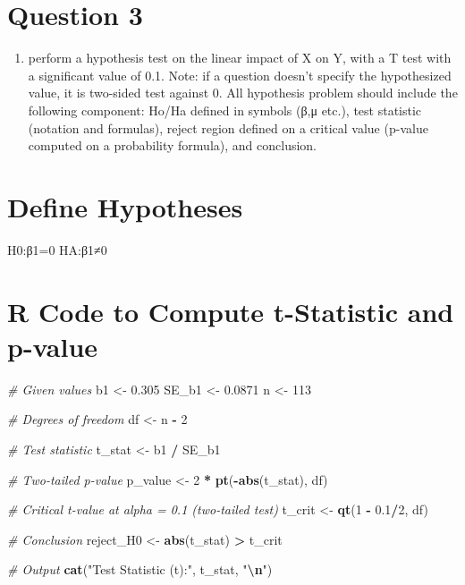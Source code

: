 \documentclass[
]{article}
\newenvironment{Shaded}{\begin{snugshade}}{\end{snugshade}}
\newcommand{\CommentTok}[1]{\textcolor[rgb]{0.56,0.35,0.01}{\textit{#1}}}
\newcommand{\DecValTok}[1]{\textcolor[rgb]{0.00,0.00,0.81}{#1}}
\newcommand{\FloatTok}[1]{\textcolor[rgb]{0.00,0.00,0.81}{#1}}
\newcommand{\FunctionTok}[1]{\textcolor[rgb]{0.13,0.29,0.53}{\textbf{#1}}}
\newcommand{\NormalTok}[1]{#1}
\newcommand{\OtherTok}[1]{\textcolor[rgb]{0.56,0.35,0.01}{#1}}
\newcommand{\SpecialCharTok}[1]{\textcolor[rgb]{0.81,0.36,0.00}{\textbf{#1}}}
\newcommand{\StringTok}[1]{\textcolor[rgb]{0.31,0.60,0.02}{#1}}
\providecommand{\tightlist}{%
  \setlength{\itemsep}{0pt}\setlength{\parskip}{0pt}}
\begin{document}
\section{Question 3}\label{question-3}

\begin{enumerate}
\def\labelenumi{\arabic{enumi})}
\setcounter{enumi}{9}
\tightlist
\item
  perform a hypothesis test on the linear impact of X on Y, with a T
  test with a significant value of 0.1. Note: if a question doesn't
  specify the hypothesized value, it is two-sided test against 0. All
  hypothesis problem should include the following component: Ho/Ha
  defined in symbols (β,μ etc.), test statistic (notation and formulas),
  reject region defined on a critical value (p-value computed on a
  probability formula), and conclusion.
\end{enumerate}

\section{Define Hypotheses}\label{define-hypotheses}

H0:β1=0 HA:β1≠0

\section{R Code to Compute t-Statistic and
p-value}\label{r-code-to-compute-t-statistic-and-p-value}

\begin{Shaded}
\begin{Highlighting}[]
\CommentTok{\# Given values}
\NormalTok{b1 }\OtherTok{\textless{}{-}} \FloatTok{0.305}
\NormalTok{SE\_b1 }\OtherTok{\textless{}{-}} \FloatTok{0.0871}
\NormalTok{n }\OtherTok{\textless{}{-}} \DecValTok{113}

\CommentTok{\# Degrees of freedom}
\NormalTok{df }\OtherTok{\textless{}{-}}\NormalTok{ n }\SpecialCharTok{{-}} \DecValTok{2}

\CommentTok{\# Test statistic}
\NormalTok{t\_stat }\OtherTok{\textless{}{-}}\NormalTok{ b1 }\SpecialCharTok{/}\NormalTok{ SE\_b1}

\CommentTok{\# Two{-}tailed p{-}value}
\NormalTok{p\_value }\OtherTok{\textless{}{-}} \DecValTok{2} \SpecialCharTok{*} \FunctionTok{pt}\NormalTok{(}\SpecialCharTok{{-}}\FunctionTok{abs}\NormalTok{(t\_stat), df)}

\CommentTok{\# Critical t{-}value at alpha = 0.1 (two{-}tailed test)}
\NormalTok{t\_crit }\OtherTok{\textless{}{-}} \FunctionTok{qt}\NormalTok{(}\DecValTok{1} \SpecialCharTok{{-}} \FloatTok{0.1}\SpecialCharTok{/}\DecValTok{2}\NormalTok{, df)}

\CommentTok{\# Conclusion}
\NormalTok{reject\_H0 }\OtherTok{\textless{}{-}} \FunctionTok{abs}\NormalTok{(t\_stat) }\SpecialCharTok{\textgreater{}}\NormalTok{ t\_crit}

\CommentTok{\# Output}
\FunctionTok{cat}\NormalTok{(}\StringTok{"Test Statistic (t):"}\NormalTok{, t\_stat, }\StringTok{"}\SpecialCharTok{\textbackslash{}n}\StringTok{"}\NormalTok{)}
\end{Highlighting}
\end{Shaded}
\end{document}
